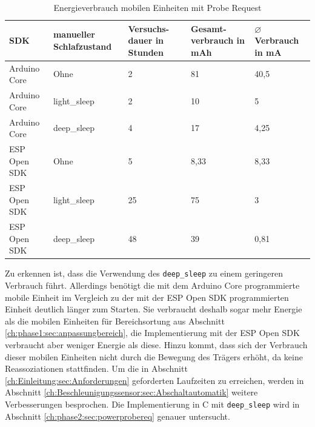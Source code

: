 \begin{table}[h]
	\centering
	\caption{Energieverbrauch mobilen Einheiten mit Probe Request}
	\label{table:probeconsumption}
	\begin{tabular}{p{3cm}|p{2.4cm}|p{2cm}|p{2cm}|p{2cm}}
		SDK & manueller Schlafzustand  & Versuchs-dauer in Stunden & Gesamt-verbrauch in mAh & $\varnothing$ Verbrauch in mA \\
		\hline
		Arduino Core & Ohne & 2 & 81 & 40,5 \\
		Arduino Core & light\_sleep & 2 & 10 & 5 \\
		Arduino Core & deep\_sleep & 4 & 17 & 4,25 \\
		ESP Open SDK & Ohne & 5 & 8,33 & 8,33 \\
		ESP Open SDK & light\_sleep & 25 & 75 & 3 \\
		ESP Open SDK & deep\_sleep & 48 & 39 & 0,81 \\
	\end{tabular}
\end{table}


Zu erkennen ist, dass die Verwendung des \texttt{deep\_sleep} zu einem geringeren Verbrauch führt. 
Allerdings benötigt die mit dem Arduino Core programmierte mobile Einheit im Vergleich zu der mit der ESP Open SDK programmierten Einheit deutlich länger zum Starten.
Sie verbraucht deshalb sogar mehr Energie als die mobilen Einheiten für Bereichsortung aus Abschnitt \ref{ch:phase1:sec:anpassungbereich}, die Implementierung mit der ESP Open SDK verbraucht aber weniger Energie als diese.
Hinzu kommt, dass sich der Verbrauch dieser mobilen Einheiten nicht durch die Bewegung des Trägers erhöht, da keine Reassoziationen stattfinden.
Um die in Abschnitt \ref{ch:Einleitung:sec:Anforderungen} geforderten Laufzeiten zu erreichen, werden in Abschnitt \ref{ch:Beschleunigungssensor:sec:Abschaltautomatik} weitere Verbesserungen besprochen.
Die Implementierung in C mit \texttt{deep\_sleep} wird in Abschnitt \ref{ch:phase2:sec:powerprobereq} genauer untersucht.

